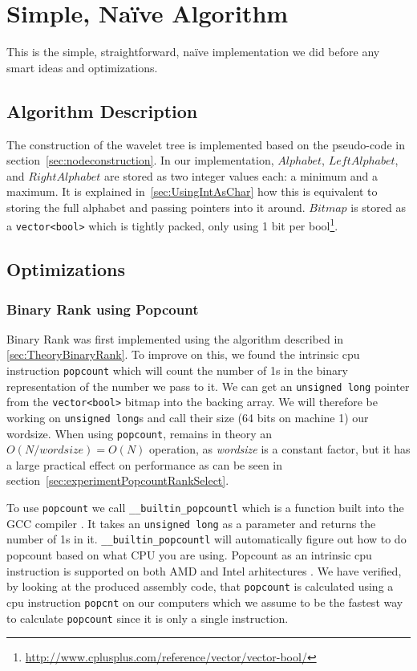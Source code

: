 \section{Simple, Naïve Algorithm}
This is the simple, straightforward, naïve implementation we did before any smart ideas and optimizations.
\subsection{Algorithm Description}
\noindent The construction of the wavelet tree is implemented based on the pseudo-code in section~\ref{sec:nodeconstruction}. In our implementation, $Alphabet$, $LeftAlphabet$, and $RightAlphabet$ are stored as two integer values each: a minimum and a maximum. It is explained in~\ref{sec:UsingIntAsChar} how this is equivalent to storing the full alphabet and passing pointers into it around. $Bitmap$ is stored as a \texttt{vector<bool>} which is tightly packed, only using 1 bit per bool\footnote{\url{http://www.cplusplus.com/reference/vector/vector-bool/}}.

\subsection{Optimizations}
\subsubsection{Binary Rank using Popcount}
\label{sec:popcountBinaryRank}
Binary Rank was first implemented using the algorithm described in \ref{sec:TheoryBinaryRank}. 
To improve on this, we found the intrinsic cpu instruction \texttt{popcount} which will count the number of 1s in the binary representation of the number we pass to it.
We can get an \texttt{unsigned long} pointer from the \texttt{vector<bool>} bitmap into the backing array. We will therefore be working on \texttt{unsigned long}s and call their size (64 bits on machine 1) our wordsize.
When using \texttt{popcount},  remains in theory an $O(N/wordsize) = O(N)$ operation, as \textit{wordsize} is a constant factor, but it has a large practical effect on performance as can be seen in section~\ref{sec:experimentPopcountRankSelect}.

To use \texttt{popcount} we call \texttt{\_\_builtin\_popcountl} which is a function built into the GCC compiler \citep{Popcount-GCC-Builtin}. 
It takes an \texttt{unsigned long} as a parameter and returns the number of 1s in it. \texttt{\_\_builtin\_popcountl} will automatically figure out how to do popcount based on what CPU you are using. Popcount as an intrinsic cpu instruction is supported on both AMD \citep{AMD-Popcount} and Intel arhitectures \citep{Intel-Popcount}.
We have verified, by looking at the produced assembly code, that \texttt{popcount} is calculated using a cpu instruction \texttt{popcnt} on our computers which we assume to be the fastest way to calculate \texttt{popcount} since it is only a single instruction.
	
